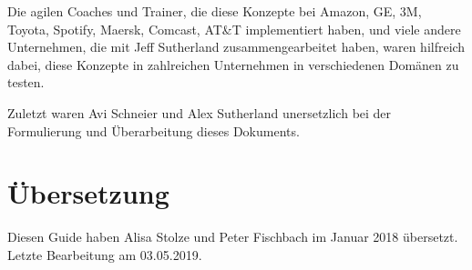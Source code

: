 \documentclass[12pt,a4paper,parskip=full]{scrartcl}
\begin{document}
Die agilen Coaches und Trainer, die diese Konzepte bei Amazon, GE, 3M, Toyota,
Spotify, Maersk, Comcast, AT\&T implementiert haben, und viele andere Unternehmen,
die mit Jeff Sutherland zusammengearbeitet haben, waren hilfreich dabei, diese
Konzepte in zahlreichen Unternehmen in verschiedenen Domänen zu testen.

Zuletzt waren Avi Schneier und Alex Sutherland unersetzlich bei der Formulierung
und Überarbeitung dieses Dokuments.

\pagebreak


\section{Übersetzung}
Diesen Guide haben Alisa Stolze und Peter Fischbach im Januar 2018 übersetzt.
Letzte Bearbeitung am 03.05.2019. 
\end{document}
